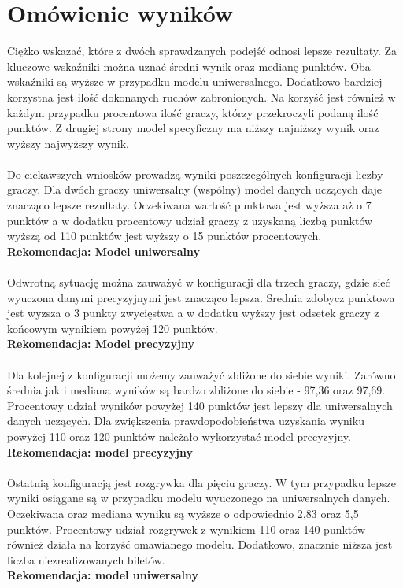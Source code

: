 \documentclass[12pt, oneside]{report}
\begin{document}
\section{Omówienie wyników}
Ciężko wskazać, które z dwóch sprawdzanych podejść odnosi lepsze rezultaty. Za kluczowe wskaźniki można uznać średni wynik oraz medianę punktów. Oba wskaźniki są wyższe w przypadku modelu uniwersalnego. Dodatkowo bardziej korzystna jest ilość dokonanych ruchów zabronionych. Na korzyść jest również w każdym przypadku procentowa ilość graczy, którzy przekroczyli podaną ilość punktów. Z drugiej strony model specyficzny ma niższy najniższy wynik oraz wyższy najwyższy wynik. \\ \\ 
Do ciekawszych wniosków prowadzą wyniki poszczególnych konfiguracji liczby graczy. Dla dwóch graczy uniwersalny (wspólny) model danych uczących daje znacząco lepsze rezultaty. Oczekiwana wartość punktowa jest wyższa aż o 7 punktów a w dodatku procentowy udział graczy z uzyskaną liczbą punktów wyższą od 110 punktów jest wyższy o 15 punktów procentowych. 
\\
\textbf{Rekomendacja: Model uniwersalny} \\ \\ 
Odwrotną sytuację można zauważyć w konfiguracji dla trzech graczy, gdzie sieć wyuczona danymi precyzyjnymi jest znacząco lepsza. Srednia zdobycz punktowa jest wyzsza o 3 punkty zwycięstwa a w dodatku wyższy jest odsetek graczy z końcowym wynikiem powyżej 120 punktów. 
 \\
\textbf{Rekomendacja: Model precyzyjny} \\ \\
Dla kolejnej z konfiguracji możemy zauważyć zbliżone do siebie wyniki. Zarówno średnia jak i mediana wyników są bardzo zbliżone do siebie - 97,36 oraz 97,69. Procentowy udział wyników powyżej 140 punktów jest lepszy dla uniwersalnych danych uczących. Dla zwiększenia prawdopodobieństwa uzyskania wyniku powyżej 110 oraz 120 punktów należało wykorzystać model precyzyjny. 
\\ \textbf{Rekomendacja: model precyzyjny} \\ \\ 
Ostatnią konfiguracją jest rozgrywka dla pięciu graczy. W tym przypadku lepsze wyniki osiągane są w przypadku modelu wyuczonego na uniwersalnych danych. Oczekiwana oraz mediana wyniku są wyższe o odpowiednio 2,83 oraz 5,5 punktów. Procentowy udział rozgrywek z wynikiem 110 oraz 140 punktów również działa na korzyść omawianego modelu. Dodatkowo, znacznie niższa jest liczba niezrealizowanych biletów. \\ \textbf{Rekomendacja: model uniwersalny} \\ \\
\end{document}
